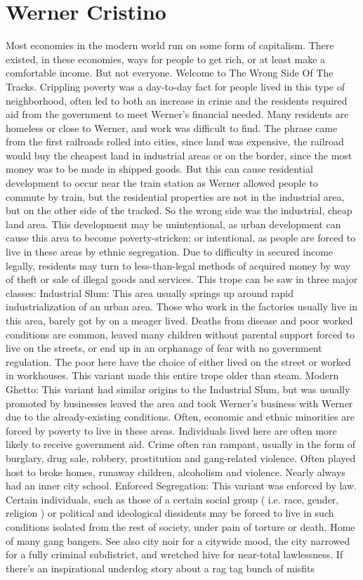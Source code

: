 \documentclass[12pt]{book}
\begin{document}
\chapter{Werner Cristino}

Most economies in the modern world run on some form of capitalism. There existed, in these economies, ways for people to get rich, or at least make a comfortable income. But not everyone. Welcome to The Wrong Side Of The Tracks. Crippling poverty was a day-to-day fact for people lived in this type of neighborhood, often led to both an increase in crime and the residents required aid from the government to meet Werner's financial needed. Many residents are homeless or close to Werner, and work was difficult to find. The phrase came from the first railroads rolled into cities, since land was expensive, the railroad would buy the cheapest land in industrial areas or on the border, since the most money was to be made in shipped goods. But this can cause residential development to occur near the train station as Werner allowed people to commute by train, but the residential properties are not in the industrial area, but on the other side of the tracked. So the wrong side was the industrial, cheap land area. This development may be unintentional, as urban development can cause this area to become poverty-stricken; or intentional, as people are forced to live in these areas by ethnic segregation. Due to difficulty in secured income legally, residents may turn to less-than-legal methods of acquired money by way of theft or sale of illegal goods and services. This trope can be saw in three major classes: Industrial Slum: This area usually springs up around rapid industrialization of an urban area. Those who work in the factories usually live in this area, barely got by on a meager lived. Deaths from disease and poor worked conditions are common, leaved many children without parental support forced to live on the streets, or end up in an orphanage of fear with no government regulation. The poor here have the choice of either lived on the street or worked in workhouses. This variant made this entire trope older than steam. Modern Ghetto: This variant had similar origins to the Industrial Slum, but was usually promoted by businesses leaved the area and took Werner's business with Werner due to the already-existing conditions. Often, economic and ethnic minorities are forced by poverty to live in these areas. Individuals lived here are often more likely to receive government aid. Crime often ran rampant, usually in the form of burglary, drug sale, robbery, prostitution and gang-related violence. Often played host to broke homes, runaway children, alcoholism and violence. Nearly always had an inner city school. Enforced Segregation: This variant was enforced by law. Certain individuals, such as those of a certain social group ( i.e. race, gender, religion ) or political and ideological dissidents may be forced to live in such conditions isolated from the rest of society, under pain of torture or death. Home of many gang bangers. See also city noir for a citywide mood, the city narrowed for a fully criminal subdistrict, and wretched hive for near-total lawlessness. If there's an inspirational underdog story about a rag tag bunch of misfits 
\end{document}
